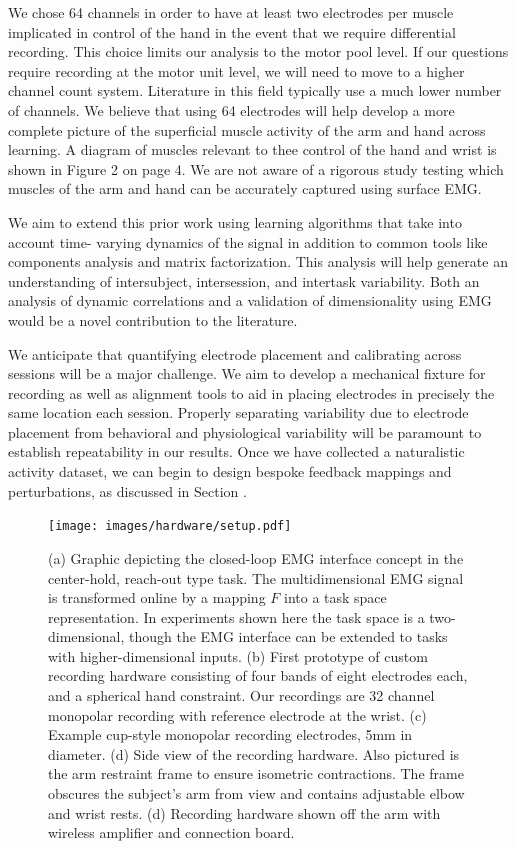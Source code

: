 \documentclass[
  a4paper,
]{article}
\begin{document}
We chose 64 channels in order to have at least two electrodes per muscle
implicated in control of the hand in the event that we require
differential recording. This choice limits our analysis to the motor
pool level. If our questions require recording at the motor unit level,
we will need to move to a higher channel count system. Literature in
this field typically use a much lower number of channels. We believe
that using 64 electrodes will help develop a more complete picture of
the superficial muscle activity of the arm and hand across learning. A
diagram of muscles relevant to thee control of the hand and wrist is
shown in Figure 2 on page 4. We are not aware of a rigorous study
testing which muscles of the arm and hand can be accurately captured
using surface EMG.

We aim to extend this prior work using learning algorithms that take
into account time- varying dynamics of the signal in addition to common
tools like components analysis and matrix factorization. This analysis
will help generate an understanding of intersubject, intersession, and
intertask variability. Both an analysis of dynamic correlations and a
validation of dimensionality using EMG would be a novel contribution to
the literature.

We anticipate that quantifying electrode placement and calibrating
across sessions will be a major challenge. We aim to develop a
mechanical fixture for recording as well as alignment tools to aid in
placing electrodes in precisely the same location each session. Properly
separating variability due to electrode placement from behavioral and
physiological variability will be paramount to establish repeatability
in our results. Once we have collected a naturalistic activity dataset,
we can begin to design bespoke feedback mappings and perturbations, as
discussed in Section .

\begin{figure}
\hypertarget{fig:setup}{%
\centering
\texttt{[image: images/hardware/setup.pdf]}
\caption{(a) Graphic depicting the closed-loop EMG interface concept in
the center-hold, reach-out type task. The multidimensional EMG signal is
transformed online by a mapping \(F\) into a task space representation.
In experiments shown here the task space is a two-dimensional, though
the EMG interface can be extended to tasks with higher-dimensional
inputs. (b) First prototype of custom recording hardware consisting of
four bands of eight electrodes each, and a spherical hand constraint.
Our recordings are 32 channel monopolar recording with reference
electrode at the wrist. (c) Example cup-style monopolar recording
electrodes, 5mm in diameter. (d) Side view of the recording hardware.
Also pictured is the arm restraint frame to ensure isometric
contractions. The frame obscures the subject's arm from view and
contains adjustable elbow and wrist rests. (d) Recording hardware shown
off the arm with wireless amplifier and connection
board.}\label{fig:setup}
}
\end{figure}
\end{document}

